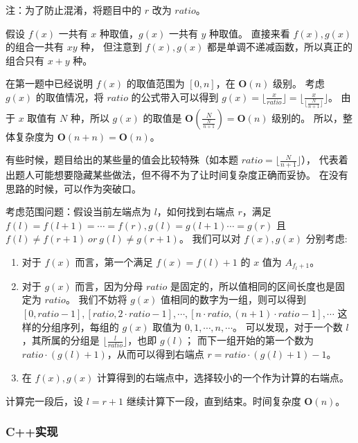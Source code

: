 注：为了防止混淆，将题目中的 $r$ 改为 $ratio$。

假设 $f(x)$ 一共有 $x$ 种取值，$g(x)$ 一共有 $y$ 种取值。
直接来看 $f(x),g(x)$ 的组合一共有 $xy$ 种，
但注意到 $f(x),g(x)$ 都是单调不递减函数，所以真正的组合只有 $x+y$ 种。

在第一题中已经说明 $f(x)$ 的取值范围为 $[0,n]$，在 $\mathbf{O}(n)$ 级别。
考虑 $g(x)$ 的取值情况，将 $ratio$ 的公式带入可以得到 $g(x)=\lfloor \frac{x}{ratio}\rfloor=\lfloor\frac{x}{\lfloor \frac{N}{n+1}\rfloor}\rfloor$。
由于 $x$ 取值有 $N$ 种，所以 $g(x)$ 的取值是 $\mathbf{O}(\frac{N}{\frac{N}{n+1}})=\mathbf{O}(n)$ 级别的。
所以，整体复杂度为 $\mathbf{O}(n+n)=\mathbf{O}(n)$。

\begin{note}
  有些时候，题目给出的某些量的值会比较特殊（如本题 $ratio=\lfloor\frac{N}{n+1}\rfloor$），
  代表着出题人可能想要隐藏某些做法，但不得不为了让时间复杂度正确而妥协。
  在没有思路的时候，可以作为突破口。
\end{note}

考虑范围问题：假设当前左端点为 $l$，如何找到右端点 $r$，满足 $f(l)=f(l+1)=\cdots=f(r),g(l)=g(l+1)\cdots=g(r)$ 且 $f(l)\not=f(r+1)\ or\ g(l)\not=g(r+1)$。
我们可以对 $f(x),g(x)$ 分别考虑:

\begin{enumerate}
  \item 对于 $f(x)$ 而言，第一个满足 $f(x)=f(l)+1$ 的 $x$ 值为 $A_{f_l + 1}$。
  \item 对于 $g(x)$ 而言，因为分母 $ratio$ 是固定的，所以值相同的区间长度也是固定为 $ratio$。
        我们不妨将 $g(x)$ 值相同的数字为一组，则可以得到 $[0,ratio-1],[ratio,2\cdot ratio-1],\cdots,[n\cdot ratio,(n+1)\cdot ratio-1],\cdots$
        这样的分组序列，每组的 $g(x)$ 取值为 $0,1,\cdots,n,\cdots$。
        可以发现，对于一个数 $l$，其所属的分组是 $\lfloor \frac{l}{ratio}\rfloor$，也即 $g(l)$；
        而下一组开始的第一个数为 $ratio\cdot (g(l)+1)$，从而可以得到右端点 $r = ratio\cdot (g(l)+1) - 1$。
  \item 在 $f(x),g(x)$ 计算得到的右端点中，选择较小的一个作为计算的右端点。
\end{enumerate}

计算完一段后，设 $l=r+1$ 继续计算下一段，直到结束。时间复杂度 $\mathbf{O}(n)$。

\subsubsection{C++实现}



